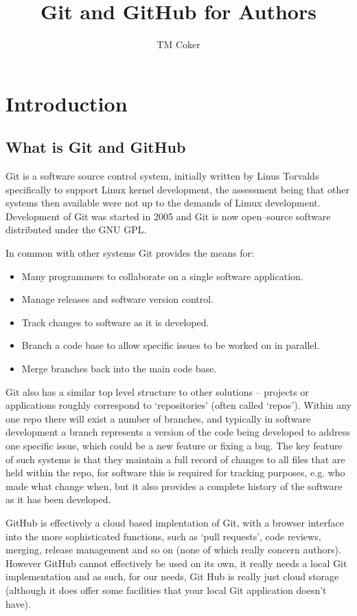 \documentclass[a4paper, 12pt]{article}
\title{Git and GitHub for Authors}
\author{TM Coker}
\begin{document}
\maketitle
\section{Introduction}
\subsection{What is Git and GitHub}
Git is a software source control system, initially written by Linus Torvalds specifically to support Linux kernel development, the assessment being that other systems then available were not up to the demands of Limux development. Development of Git was started in 2005 and Git is now open--source software distributed under the GNU GPL.

In common with other systems Git provides the means for:
\begin{itemize}
\item Many programmers to collaborate on a single software application.
\item Manage releases and software version control.
\item Track changes to software as it is developed.
\item Branch a code base to allow specific issues to be worked on in parallel.
\item Merge branches back into the main code base.
\end{itemize}

Git also has a similar top level structure to other solutions -- projects or applications roughly correspond to `repositories' (often called `repos'). Within any one repo there will exist a number of branches, and typically in software development a branch represents a version of the code being developed to address one specific issue, which could be a new feature or fixing a bug. The key feature of such systems is that they maintain a full record of changes to all files that are held within the repo, for software this is required for tracking purposes, e.g. who made what change when, but it also provides a complete history of the software as it has been developed.

GitHub is effectively a cloud based implentation of Git, with a browser interface into the more sophisticated functions, such as `pull requests', code reviews, merging, release management and so on (none of which really concern authors). However GitHub cannot effectively be used on its own, it really needs a local Git implementation and as such, for our needs, Git Hub is really just cloud storage (although it does offer some facilities that your local Git application doesn't have).
\end{document}
